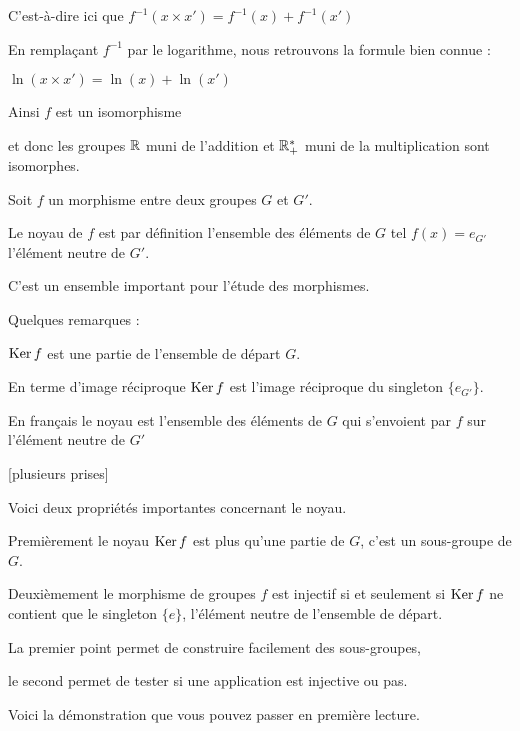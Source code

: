 C'est-à-dire ici que $f^{-1}(x\times x')=f^{-1}(x) + f^{-1}(x')$

En remplaçant $f^{-1}$ par le logarithme, nous retrouvons la formule bien connue :

$\ln(x \times x') = \ln(x) + \ln(x')$


\change

Ainsi $f$ est un isomorphisme

et donc les groupes $\mathbb{R}$ muni de l'addition  et $\mathbb{R}_+^*$ muni de la multiplication sont
isomorphes.


\diapo

Soit $f$ un morphisme entre deux groupes $G$ et $G'$.

Le noyau de $f$ est par définition l'ensemble des éléments de $G$
tel $f(x)=e_{G'}$ l'élément neutre de $G'$.

C'est un ensemble important pour l'étude des morphismes.

\change

Quelques remarques :

$\mathop{\text{Ker}}\nolimits f$ est une partie de l'ensemble de départ $G$.

\change

En terme d'image réciproque $\mathop{\text{Ker}}\nolimits f$ est l'image réciproque du singleton $\{ e_{G'}\}$.

\change

En français le noyau est l'ensemble des éléments de $G$ qui s'envoient 
par $f$ sur l'élément neutre de $G'$


\diapo


[plusieurs prises]


Voici deux propriétés importantes concernant le noyau.


Premièrement le noyau $\mathop{\text{Ker}}\nolimits f$ est plus qu'une partie de $G$, 
c'est un sous-groupe de $G$.

\change

Deuxièmement le morphisme de groupes
$f$ est injectif si et seulement si $\mathop{\text{Ker}}\nolimits f$
ne contient que le singleton $\{e\}$, l'élément neutre de l'ensemble de départ.

La premier point permet de construire facilement des sous-groupes,

le second permet de tester si une application est injective ou pas.

\change

Voici la démonstration que vous pouvez passer en première lecture.

